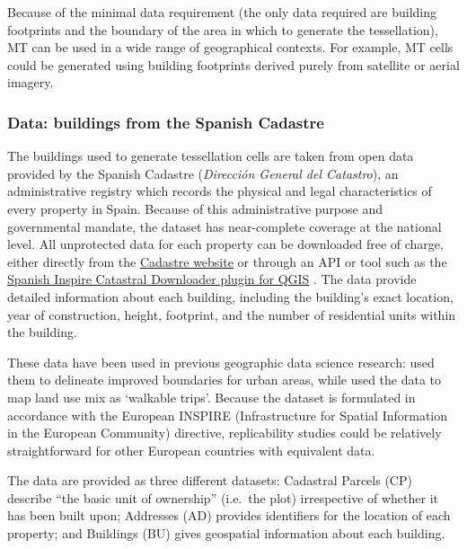 \documentclass[a4paper, nobind]{templates/ociamthesis}
\begin{document}
Because of the minimal data requirement (the only data required are building footprints and the boundary of the area in which to generate the tessellation), MT can be used in a wide range of geographical contexts. For example, MT cells could be generated using building footprints derived purely from satellite or aerial imagery.

\hypertarget{data-buildings-from-the-spanish-cadastre}{%
\subsubsection{Data: buildings from the Spanish Cadastre}\label{data-buildings-from-the-spanish-cadastre}}

The buildings used to generate tessellation cells are taken from open data provided by the Spanish Cadastre (\emph{Dirección General del Catastro}), an administrative registry which records the physical and legal characteristics of every property in Spain. Because of this administrative purpose and governmental mandate, the dataset has near-complete coverage at the national level. All unprotected data for each property can be downloaded free of charge, either directly from the \href{http://www.sedecatastro.gob.es/}{Cadastre website} or through an API or tool such as the \href{https://plugins.qgis.org/plugins/Spanish_Inspire_Catastral_Downloader/}{Spanish Inspire Catastral Downloader plugin for QGIS} \citep{soriano2021}. The data provide detailed information about each building, including the building's exact location, year of construction, height, footprint, and the number of residential units within the building.

These data have been used in previous geographic data science research: \citet{arribas-bel2019} used them to delineate improved boundaries for urban areas, while \citet{carpio-pinedo2021} used the data to map land use mix as `walkable trips'. Because the dataset is formulated in accordance with the European INSPIRE (Infrastructure for Spatial Information in the European Community) directive, replicability studies could be relatively straightforward for other European countries with equivalent data.

The data are provided as three different datasets: Cadastral Parcels (CP) describe ``the basic unit of ownership'' (i.e.~the plot) irrespective of whether it has been built upon; Addresses (AD) provides identifiers for the location of each property; and Buildings (BU) gives geospatial information about each building.
\end{document}
